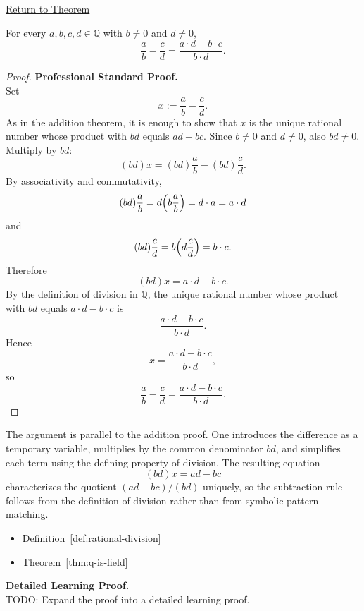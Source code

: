 \newpage
{}
\label{prf:rational-fraction-subtraction}

\begin{remark*}[Return]
\hyperref[thm:rational-fraction-subtraction]{Return to Theorem}
\end{remark*}

\begin{theorem*}
For every $a,b,c,d\in\mathbb{Q}$ with $b\neq 0$ and $d\neq 0$,
\[
\frac{a}{b}-\frac{c}{d}
=
\frac{a\cdot d-b\cdot c}{b\cdot d}.
\]
\end{theorem*}

\begin{proof}
\textbf{Professional Standard Proof.}~\\
Set
\[
x:=\frac{a}{b}-\frac{c}{d}.
\]
As in the addition theorem, it is enough to show that $x$ is the unique
rational number whose product with $bd$ equals $ad-bc$.  Since $b\neq 0$ and
$d\neq 0$, also $bd\neq 0$.  Multiply by $bd$:
\[
(bd)x=(bd)\frac{a}{b}-(bd)\frac{c}{d}.
\]
By associativity and commutativity,
\[
(bd)\frac{a}{b}=d\Bigl(b\frac{a}{b}\Bigr)=d\cdot a=a\cdot d
\]
and
\[
(bd)\frac{c}{d}=b\Bigl(d\frac{c}{d}\Bigr)=b\cdot c.
\]
Therefore
\[
(bd)x=a\cdot d-b\cdot c.
\]
By the definition of division in $\mathbb{Q}$, the unique rational number
whose product with $bd$ equals $a\cdot d-b\cdot c$ is
\[
\frac{a\cdot d-b\cdot c}{b\cdot d}.
\]
Hence
\[
x=\frac{a\cdot d-b\cdot c}{b\cdot d},
\]
so
\[
\frac{a}{b}-\frac{c}{d}
=
\frac{a\cdot d-b\cdot c}{b\cdot d}.
\]
\end{proof}

\begin{remark*}
The argument is parallel to the addition proof.  One introduces the
difference as a temporary variable, multiplies by the common denominator
$bd$, and simplifies each term using the defining property of division.
The resulting equation
\[
(bd)x=ad-bc
\]
characterizes the quotient $(ad-bc)/(bd)$ uniquely, so the subtraction rule
follows from the definition of division rather than from symbolic pattern
matching.
\end{remark*}

\begin{dependencies}
\begin{itemize}
  \item \hyperref[def:rational-division]{Definition~\ref*{def:rational-division}}
  \item \hyperref[thm:q-is-field]{Theorem~\ref*{thm:q-is-field}}
\end{itemize}
\end{dependencies}

\textbf{Detailed Learning Proof.}~\\
TODO: Expand the proof into a detailed learning proof.

